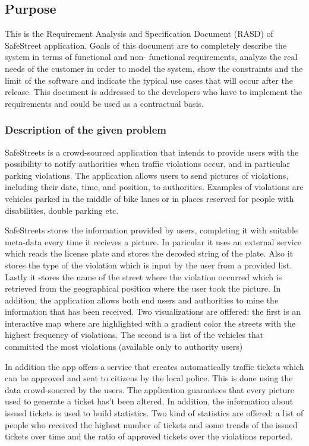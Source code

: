 \subsection{Purpose}
This is the Requirement Analysis and Specification Document (RASD) of SafeStreet application. Goals of this document are to completely describe the system in terms of functional and non- functional requirements, analyze the real needs of the customer in order to model the system, show the constraints and the limit of the software and indicate the typical use cases that will occur after the release. This document is addressed to the developers who have to implement the requirements and could be used as a contractual basis.

\subsubsection{Description of the given problem}
SafeStreets is a crowd-sourced application that intends to provide users with the possibility to notify authorities when traffic violations occur, and in particular parking violations. The application allows users to send pictures of violations, including their date, time, and position, to authorities. Examples of violations are vehicles parked in the middle of bike lanes or in places reserved for people with disabilities, double parking etc.

SafeStreets stores the information provided by users, completing it with suitable meta-data every time it recieves a picture.
In paricular it uses an external service which reads the license plate and stores the decoded string of the plate.
Also it stores the type of the violation which is input by the user from a provided list.
Lastly it stores the name of the street where the violation occurred which is retrieved from the geographical position where the user took the picture.
In addition, the application allows both end users and authorities to mine the information that has been received.
Two visualizations are offfered: the first is an interactive map where are highlighted with a gradient color the streets  with the highest frequency of violations.
The second is a list of the vehicles that committed the most violations (available only to authority users)

In addition the app offers a service that creates automatically traffic tickets which can be approved and sent to citizens by the local police.  This is done using the data crowd-soucred by the users.
The application guarantees that every picture used to generate a ticket has't been altered.
In addition, the information about issued tickets is used to build statistics.
Two kind of statistics are offered: a list of people who received the highest number of tickets and some trends of the issued tickets over time and the ratio of approved tickets over the violations reported.


